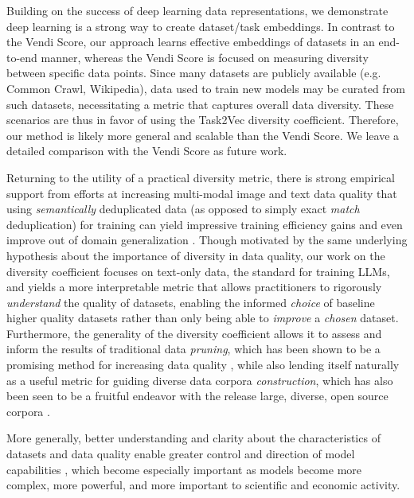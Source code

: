 Building on the success of deep learning data representations, we demonstrate deep learning is a strong way to create dataset/task embeddings.
In contrast to the Vendi Score, our approach learns effective embeddings of datasets in an end-to-end manner, whereas the Vendi Score is focused on measuring diversity between specific data points. 
Since many datasets are publicly available (e.g. Common Crawl, Wikipedia), data used to train new models may be curated from such datasets, necessitating a metric that captures overall data diversity.
These scenarios are thus in favor of using the Task2Vec diversity coefficient. 
Therefore, our method is likely more general and scalable than the Vendi Score. 
We leave a detailed comparison with the Vendi Score as future work.

Returning to the utility of a practical diversity metric, there is strong empirical support from efforts at increasing multi-modal image and text data quality that using \textit{semantically} deduplicated data (as opposed to simply exact \textit{match} deduplication) for training can yield impressive training efficiency gains and even improve out of domain generalization \citep{abbas2023semdedup, abbas2024effective}. Though motivated by the same underlying hypothesis about the importance of diversity in data quality, our work on the diversity coefficient focuses on text-only data, the standard for training LLMs, and yields a more interpretable metric that allows practitioners to rigorously \textit{understand} the quality of datasets, enabling the informed \textit{choice} of baseline higher quality datasets rather than only being able to \textit{improve} a \textit{chosen} dataset. Furthermore, the generality of the diversity coefficient allows it to assess and inform the results of traditional data \textit{pruning}, which has been shown to be a promising method for increasing data quality \citep{sorscher2023neural}, while also lending itself naturally as a useful metric for guiding diverse data corpora \textit{construction}, which has also been seen to be a fruitful endeavor with the release large, diverse, open source corpora \citep{thepile}.

More generally, better understanding and clarity about the characteristics of datasets and data quality enable greater control and direction of model capabilities \citep{mitchell2023measuring}, which become especially important as models become more complex, more powerful, and more important to scientific and economic activity. 

